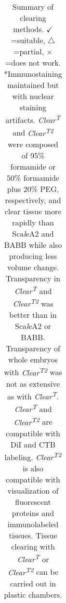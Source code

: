 \begin{landscape}
\begin{table}[hbtp]
\begin{center}
\begin{tabular}{lc|c|c|c|}
\end{tabular}
\scriptsize
\caption[Summary of clearing methods.]{
\scriptsize
Summary of clearing methods.
$\checkmark$=suitable, $\bigtriangleup$=partial, $\times$=does not work.
*Immunostaining maintained but with nuclear staining artifacts.
\emph{Clear\textsuperscript{T}} and \emph{Clear\textsuperscript{T2}} were composed of 95\% formamide or 50\% formamide plus 20\% PEG, respectively, and clear tissue more rapidly than Sca\emph{l}eA2 and BABB while also producing less volume change.
Transparency in \emph{Clear\textsuperscript{T}} and \emph{Clear\textsuperscript{T2}} was better than in Sca\emph{l}eA2 or BABB.
Transparency of whole embryos with \emph{Clear\textsuperscript{T2}} was not as extensive as with \emph{Clear\textsuperscript{T}}.
\emph{Clear\textsuperscript{T}} and \emph{Clear\textsuperscript{T2}} are compatible with DiI and CTB labeling.
\emph{Clear\textsuperscript{T2}} is also compatible with visualization of fluorescent proteins and immunolabeled tissues.
Tissue clearing with \emph{Clear\textsuperscript{T}} or \emph{Clear\textsuperscript{T2}} can be carried out in plastic chambers.}
\end{center}
\end{table}
\end{landscape}
\normalsize

